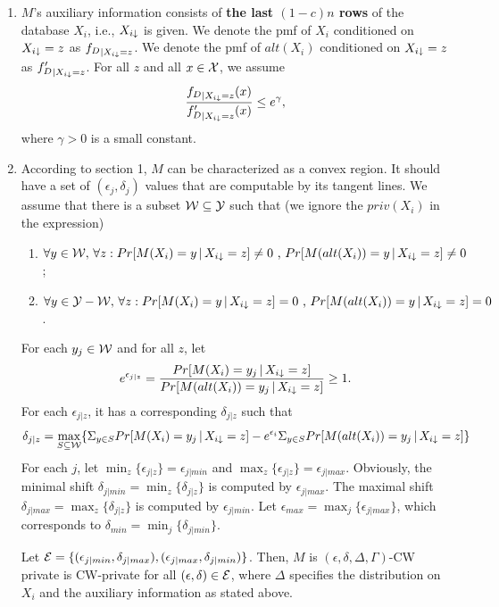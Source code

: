 \documentclass[11pt]{article}
\begin{document}
\begin{enumerate}
\item $M$'s auxiliary information consists of {\bf the last $(1-c)n$ rows} of the database $X_{i}$, i.e., $X_{i \downarrow}$ is given. We denote the pmf of $X_{i}$ conditioned on $X_{i \downarrow} =z$ as ${f_{D}}_{|X_{i \downarrow} = z}$. We denote the pmf of $alt(X_{i})$ conditioned on $X_{i \downarrow} =z$ as ${f'_{D}}_{|X_{i \downarrow} = z}$. For all $z$ and all $x \in {\cal X}$, we assume $$\frac{{f_{D}}_{|X_{i \downarrow} = z} (x)}{{f'_{D}}_{|X_{i \downarrow} = z}(x)} \leq e^{\gamma},$$ where $\gamma>0$ is a small constant.
\item According to section 1, $M$ can be characterized as a convex region. It should have a set of $(\epsilon_{j}, \delta_{j})$ values that are computable by its tangent lines. We assume that there is a subset ${\cal W} \subseteq {\cal Y}$ such that (we ignore the $priv(X_{i})$ in the expression)
\begin{enumerate}
\item $\forall y \in {\cal W},\, \forall z: Pr[M(X_{i})=y\,|\,X_{i \downarrow}=z] \neq 0 \text{ , }Pr[M(alt(X_{i}))=y\,|\,X_{i \downarrow}=z] \neq 0$ ;
\item $\forall y \in {\cal Y-W},\, \forall z: Pr[M(X_{i})=y\,|\,X_{i \downarrow}=z] = 0 \text{ , }Pr[M(alt(X_{i}))=y\,|\,X_{i \downarrow}=z] = 0$ .
\end{enumerate}
For each $y_{j} \in {\cal W}$ and for all $z$, let 
\begin{equation}
 e^{\epsilon_{j|z}} = \frac{Pr[M(X_{i})=y_{j}\,|\,X_{i \downarrow}=z] }{Pr[M(alt(X_{i}))=y_{j}\,|\,X_{i \downarrow}=z] } \geq  1.
\end{equation}
For each $\epsilon_{j|z}$, it has a corresponding $\delta_{j|z}$ such that
\begin{equation}
\delta_{j|z} =\max_{S \subseteq {\cal W}} \{ \Sigma_{y \in S}Pr[M(X_{i})=y_{j}\,|\,X_{i \downarrow}=z] - e^{\epsilon_{i}}\Sigma_{y \in S}Pr[M(alt(X_{i}))=y_{j}\,|\,X_{i \downarrow}=z]\} 
\end{equation} 
For each $j$, let $\min_{z} \{\epsilon_{j|z} \}= \epsilon_{j|min}$ and $\max_{z} \{\epsilon_{j|z} \}= \epsilon_{j|max}$. Obviously, the minimal shift $\delta_{j|min}=\min_{z} \{\delta_{j|z}\} $ is computed by $\epsilon_{j|max}$. The maximal shift $\delta_{j|max}=\max_{z} \{\delta_{j|z}\} $ is computed by $\epsilon_{j|min}$. Let $\epsilon_{max} = \max_{j} \{\epsilon_{j|max}\}$, which corresponds to $\delta_{min} = \min_{j} \{\delta_{j|min}\}$.

Let ${\cal E} = \{(\epsilon_{j|min}, \delta_{j|max}), (\epsilon_{j|max}, \delta_{j|min})\}$. Then, $M$ is $(\epsilon, \delta, \Delta, \Gamma)$-CW private is  CW-private for all $(\epsilon, \delta) \in {\cal E}$, where $\Delta$ specifies the distribution on $X_{i}$ and the auxiliary information as stated above.
\end{enumerate}
\end{document}
